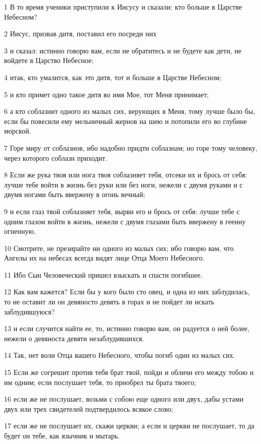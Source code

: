 \par 1 В то время ученики приступили к Иисусу и сказали: кто больше в Царстве Небесном?
\par 2 Иисус, призвав дитя, поставил его посреди них
\par 3 и сказал: истинно говорю вам, если не обратитесь и не будете как дети, не войдете в Царство Небесное;
\par 4 итак, кто умалится, как это дитя, тот и больше в Царстве Небесном;
\par 5 и кто примет одно такое дитя во имя Мое, тот Меня принимает;
\par 6 а кто соблазнит одного из малых сих, верующих в Меня, тому лучше было бы, если бы повесили ему мельничный жернов на шею и потопили его во глубине морской.
\par 7 Горе миру от соблазнов, ибо надобно придти соблазнам; но горе тому человеку, через которого соблазн приходит.
\par 8 Если же рука твоя или нога твоя соблазняет тебя, отсеки их и брось от себя: лучше тебе войти в жизнь без руки или без ноги, нежели с двумя руками и с двумя ногами быть ввержену в огонь вечный;
\par 9 и если глаз твой соблазняет тебя, вырви его и брось от себя: лучше тебе с одним глазом войти в жизнь, нежели с двумя глазами быть ввержену в геенну огненную.
\par 10 Смотрите, не презирайте ни одного из малых сих; ибо говорю вам, что Ангелы их на небесах всегда видят лице Отца Моего Небесного.
\par 11 Ибо Сын Человеческий пришел взыскать и спасти погибшее.
\par 12 Как вам кажется? Если бы у кого было сто овец, и одна из них заблудилась, то не оставит ли он девяносто девять в горах и не пойдет ли искать заблудившуюся?
\par 13 и если случится найти ее, то, истинно говорю вам, он радуется о ней более, нежели о девяноста девяти незаблудившихся.
\par 14 Так, нет воли Отца вашего Небесного, чтобы погиб один из малых сих.
\par 15 Если же согрешит против тебя брат твой, пойди и обличи его между тобою и им одним; если послушает тебя, то приобрел ты брата твоего;
\par 16 если же не послушает, возьми с собою еще одного или двух, дабы устами двух или трех свидетелей подтвердилось всякое слово;
\par 17 если же не послушает их, скажи церкви; а если и церкви не послушает, то да будет он тебе, как язычник и мытарь.
